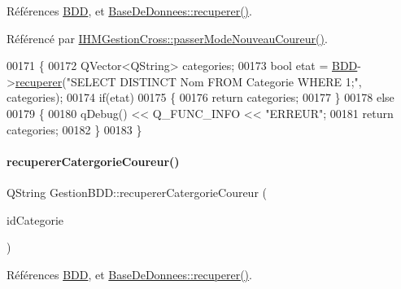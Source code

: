 Références \hyperlink{class_gestion_b_d_d_a1bd17cbf5754eb6e54ae351f1d02dca2}{B\+DD}, et \hyperlink{class_base_de_donnees_a77539baad389f5acf754cd2cd452403e}{Base\+De\+Donnees\+::recuperer()}.



Référencé par \hyperlink{class_i_h_m_gestion_cross_ac8f336c95a5f0c9eb8a4bc1c4bb83445}{I\+H\+M\+Gestion\+Cross\+::passer\+Mode\+Nouveau\+Coureur()}.


\begin{DoxyCode}
00171 \{
00172     QVector<QString> categories;
00173     \textcolor{keywordtype}{bool} etat = \hyperlink{class_gestion_b_d_d_a1bd17cbf5754eb6e54ae351f1d02dca2}{BDD}->\hyperlink{class_base_de_donnees_a77539baad389f5acf754cd2cd452403e}{recuperer}(\textcolor{stringliteral}{"SELECT DISTINCT Nom FROM Categorie WHERE 1;"}, categories);
00174     \textcolor{keywordflow}{if}(etat)
00175     \{
00176         \textcolor{keywordflow}{return} categories;
00177     \}
00178     \textcolor{keywordflow}{else}
00179     \{
00180         qDebug() << Q\_FUNC\_INFO << \textcolor{stringliteral}{"ERREUR"};
00181         \textcolor{keywordflow}{return} categories;
00182     \}
00183 \}
\end{DoxyCode}
\mbox{\label{class_gestion_b_d_d_ad7b0117ad5d55f21e6f00858038f4a85}} 
\paragraph{\texorpdfstring{recuperer\+Catergorie\+Coureur()}{recupererCatergorieCoureur()}}
{\footnotesize\ttfamily Q\+String Gestion\+B\+D\+D\+::recuperer\+Catergorie\+Coureur (\begin{DoxyParamCaption}\item[{Q\+String}]{id\+Categorie }\end{DoxyParamCaption})}



Références \hyperlink{class_gestion_b_d_d_a1bd17cbf5754eb6e54ae351f1d02dca2}{B\+DD}, et \hyperlink{class_base_de_donnees_a77539baad389f5acf754cd2cd452403e}{Base\+De\+Donnees\+::recuperer()}.


